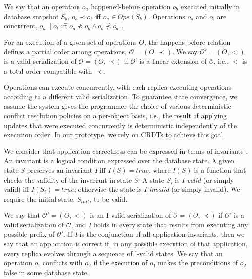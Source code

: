 \documentclass[sigplan,10pt]{acmart}
\begin{document}
We say that an operation $o_a$
happened-before operation $o_b$ executed initially in  database snapshot $S_b$,
$o_a \! \prec o_b$ iff \mbox{$o_a \in Ops(S_b)$}.
Operations $o_a$ and $o_b$ are concurrent, $o_a \! \parallel \! o_b$ iff
$o_a \!\not \prec o_b \! \wedge \! o_b \!\not \prec \! o_a$ \cite{happensbefore}.

For an execution of a given set of operations $O$, the happens-before relation defines
a partial order among operations, \mbox{$\mathcal{O} = (O,\prec)$}.
We say $\mathcal{O'} = (O,<)$ is a valid serialization of $\mathcal{O} = (O,\prec)$
if $\mathcal{O'}$ is a linear extension of $\mathcal{O}$, i.e., $<$ is a total order
compatible with $\prec$.

Operations can execute concurrently, with each replica
executing operations according to a different valid
serialization.
To guarantee state convergence, we assume the system gives the programmer 
the choice of various deterministic conflict resolution policies
on a per-object basis, i.e., the result of
applying updates that were executed concurrently is deterministic
independently of the execution order.
In our prototype, we rely on CRDTs
\cite{crdt,walter} to achieve this goal.

We consider that application correctness can be expressed in
terms of invariants \cite{bailisiser,indigo,cise}.
An invariant is a logical condition expressed over the database
state.
A given state $S$ preserves an invariant $I$ iff $I(S) = \mathit{true}$,
where $I(S)$ is a function that checks the validity of the invariant in state $S$.
A state $S_i$ is \emph{I-valid} (or simply valid) iff $I(S_{i}) = \mathit{true}$; otherwise the state is
\emph{I-invalid} (or simply invalid).
We require the initial state, $S_{init}$, to be valid.

We say that $\mathcal{O'} = (O,<)$ is an I-valid serialization of \mbox{$\mathcal{O} = (O,\prec)$}
if $\mathcal{O'}$ is a valid serialization of $\mathcal{O}$, and $I$ holds in every state that
results from executing any possible prefix of $\mathcal{O'}$.
If $I$ is the conjunction of all application invariants, then we say that
an application is correct if, in any possible execution of that application,
every replica evolves through a sequence of I-valid states.
We say that an operation $o_1$ conflicts with $o_2$ if the execution of
$o_1$ makes the preconditions of $o_2$ false in some database state.
\end{document}
